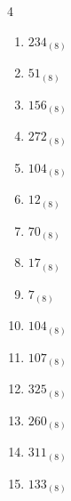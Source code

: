 \begin{multicols}{4}
\begin{enumerate}
        \phantom{$=235$}

  \item $234_{(8)}$

        \phantom{$=156$}

\columnbreak %

  \item $51_{(8)}$

        \phantom{$=41$}

  \item $156_{(8)}$

        \phantom{$=110$}

  \item $272_{(8)}$

        \phantom{$=186$}

  \item $104_{(8)}$

        \phantom{$=68$}

  \item $12_{(8)}$

        \phantom{$=10$}

  \item $70_{(8)}$

        \phantom{$=56$}

  \item $17_{(8)}$

        \phantom{$=15$}

  \item $7_{(8)}$

        \phantom{$=7$}

  \item $104_{(8)}$

        \phantom{$=68$}

  \item $107_{(8)}$

        \phantom{$=71$}

  \item $325_{(8)}$

        \phantom{$=213$}

  \item $260_{(8)}$

        \phantom{$=176$}

  \item $311_{(8)}$

        \phantom{$=201$}

  \item $133_{(8)}$

        \phantom{$=91$}


\end{enumerate}
\end{multicols}
